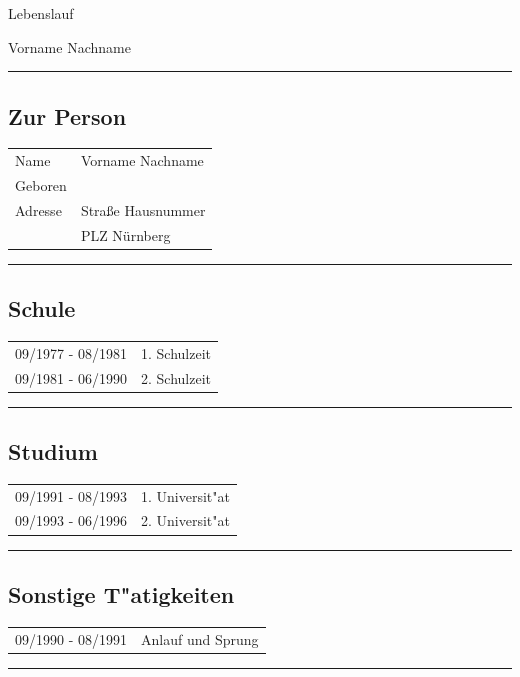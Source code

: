 \pagestyle{empty}


\begin{center}
{\sc \LARGE
Lebenslauf
}

\medskip

\medskip

{\sc \Large
Vorname Nachname
}

\end{center}

\bigskip
\rule{\textwidth}{0.1em}




\subsection*{\sc Zur Person}
\begin{tabular}{lp{9cm}}
Name & Vorname Nachname\\
Geboren &  \\
Adresse & Stra{\ss}e Hausnummer \\
        & PLZ N\"urnberg
\end{tabular}
\smallskip

\rule{\textwidth}{0.1em}



\subsection*{\sc Schule}
\begin{tabular}{lp{9cm}}
09/1977 - 08/1981 & 1. Schulzeit \\
09/1981 - 06/1990 & 2. Schulzeit
\end{tabular}

\smallskip
\rule{\textwidth}{0.1em}

\subsection*{\sc Studium}
\begin{tabular}{lp{9cm}}
09/1991 - 08/1993 & 1. Universit"at \\
09/1993 - 06/1996 & 2. Universit"at
\end{tabular}


\smallskip
\rule{\textwidth}{0.1em}


\subsection*{\sc Sonstige T"atigkeiten}
\begin{tabular}{lp{9cm}}
09/1990 - 08/1991 & Anlauf und Sprung
\end{tabular}


\smallskip
\rule{\textwidth}{0.1em}


